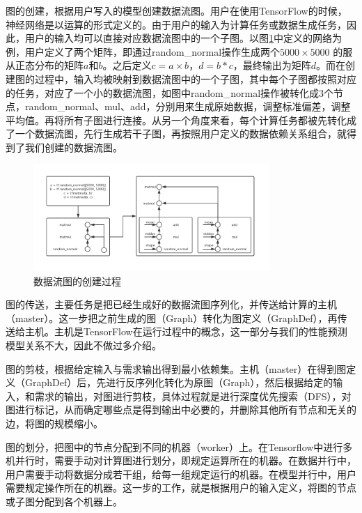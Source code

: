     图的创建，根据用户写入的模型创建数据流图。用户在使用TensorFlow的时候，神经网络是以运算的形式定义的。由于用户的输入为计算任务或数据生成任务，因此，用户的输入均可以直接对应数据流图中的一个子图。以图\ref{fig:dag_mat}中定义的网络为例，用户定义了两个矩阵，即通过random\_normal操作生成两个$ 5000 \times 5000 $ 的服从正态分布的矩阵$ a $和$ b $。之后定义$ c = a \times b $，$ d = b * c $，最终输出为矩阵$ d $。而在创建图的过程中，输入均被映射到数据流图中的一个子图，其中每个子图都按照对应的任务，对应了一个小的数据流图，如图中random\_normal操作被转化成3个节点，random\_normal、mul、add，分别用来生成原始数据，调整标准偏差，调整平均值。再将所有子图进行连接。从另一个角度来看，每个计算任务都被先转化成了一个数据流图，先行生成若干子图，再按照用户定义的数据依赖关系组合，就得到了我们创建的数据流图。
    
    \begin{figure}[!htbp]
        \centering
        \includegraphics[width=0.8\textwidth]{figures/dag_mat.jpg}
        \caption{数据流图的创建过程}
        \label{fig:dag_mat}
    \end{figure}

    图的传送，主要任务是把已经生成好的数据流图序列化，并传送给计算的主机（master）。这一步把之前生成的图（Graph）转化为图定义（GraphDef），再传送给主机。主机是TensorFlow在运行过程中的概念，这一部分与我们的性能预测模型关系不大，因此不做过多介绍。
    
    图的剪枝，根据给定输入与需求输出得到最小依赖集。主机（master）在得到图定义（GraphDef）后，先进行反序列化转化为原图（Graph），然后根据给定的输入，和需求的输出，对图进行剪枝，具体过程就是进行深度优先搜索（DFS），对图进行标记，从而确定哪些点是得到输出中必要的，并删除其他所有节点和无关的边，将图的规模缩小。
    
    图的划分，把图中的节点分配到不同的机器（worker）上。在Tensorflow中进行多机并行时，需要手动对计算图进行划分，即规定运算所在的机器。在数据并行中，用户需要手动将数据分成若干组，给每一组规定运行的机器。在模型并行中，用户需要规定操作所在的机器。这一步的工作，就是根据用户的输入定义，将图的节点或子图分配到各个机器上。
    
